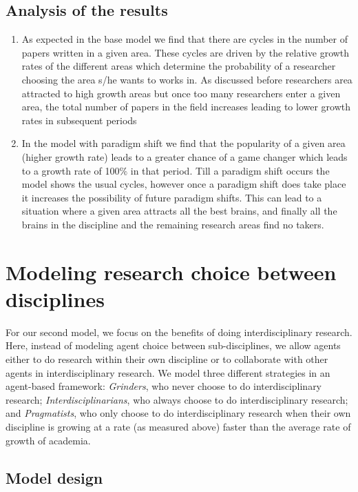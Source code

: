 \documentclass[letterpaper]{article} %
\begin{document}
\subsection{Analysis of the results}
\begin{enumerate}
\item
As expected in the base model we find that there are cycles in the number of papers written in a given area. These cycles are driven by the relative growth rates of the different areas which determine the probability of a researcher choosing the area s/he wants to works in. As discussed before researchers area attracted to high growth areas but once too many researchers enter a given area, the total number of papers in the field increases leading to lower growth rates in subsequent periods
\item
In the model with paradigm shift we find that the popularity of a given area (higher growth rate) leads to a greater chance of a game changer which leads to a growth rate of 100$\%$ in that period. Till a paradigm shift occurs the model shows the usual cycles, however once a paradigm shift does take place it increases the possibility of future paradigm shifts. This can lead to a situation where a given area attracts all the best brains, and finally all the brains in the discipline and the remaining research areas find no takers. 
\end{enumerate}

\section{Modeling research choice between disciplines}
For our second model, we focus on the benefits of doing interdisciplinary research. Here, instead of modeling agent choice between sub-disciplines, we allow agents either to do research within their own discipline or to collaborate with other agents in interdisciplinary research. We model three different strategies in an agent-based framework: \emph{Grinders}, who never choose to do interdisciplinary research; \emph{Interdisciplinarians}, who always choose to do interdisciplinary research; and \emph{Pragmatists}, who only choose to do interdisciplinary research when their own discipline is growing at a rate (as measured above) faster than the average rate of growth of academia.

\subsection{Model design}
\end{document}

